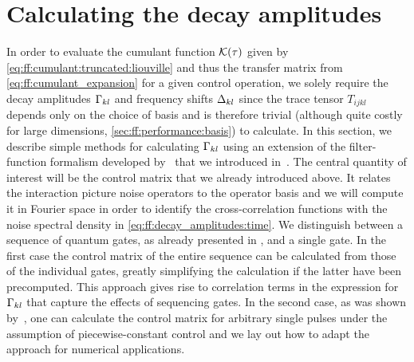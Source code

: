 
\section{Calculating the decay amplitudes}\label{sec:ff:theory:decay_amplitudes}
In order to evaluate the cumulant function $\mathcal{K}(\tau)$ given by \cref{eq:ff:cumulant:truncated:liouville} and thus the transfer matrix \liouvUetavg from \cref{eq:ff:cumulant_expansion} for a given control operation, we solely require the decay amplitudes $\Gamma_{kl}$ and frequency shifts $\Delta_{kl}$ since the trace tensor $T_{ijkl}$ depends only on the choice of basis and is therefore trivial (although quite costly for large dimensions, \cf \cref{sec:ff:performance:basis}) to calculate.
In this section, we describe simple methods for calculating $\Gamma_{kl}$ using an extension of the filter-function formalism developed by~\textcite{Green2013} that we introduced in~.
The central quantity of interest will be the control matrix that we already introduced above.
It relates the interaction picture noise operators to the operator basis and we will compute it in Fourier space in order to identify the cross-correlation functions with the noise spectral density in \cref{eq:ff:decay_amplitudes:time}.
We distinguish between a sequence of quantum gates, as already presented in , and a single gate.
In the first case the control matrix of the entire sequence can be calculated from those of the individual gates, greatly simplifying the calculation if the latter have been precomputed.
This approach gives rise to correlation terms in the expression for $\Gamma_{kl}$ that capture the effects of sequencing gates.
In the second case, as was shown by~\textcite{Green2013}, one can calculate the control matrix for arbitrary single pulses under the assumption of piecewise-constant control and we lay out how to adapt the approach for numerical applications.

